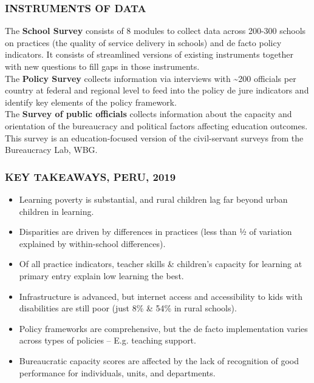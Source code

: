 \documentclass[twocolumn]{article}
\providecommand{\tightlist}{%
  \setlength{\itemsep}{0pt}\setlength{\parskip}{0pt}}
\begin{document}
\hypertarget{instruments-of-data}{%
\subsubsection{\texorpdfstring{\textbf{INSTRUMENTS OF
DATA}}{INSTRUMENTS OF DATA}}\label{instruments-of-data}}

The \textbf{School Survey} consists of 8 modules to collect data across
200-300 schools on practices (the quality of service delivery in
schools) and de facto policy indicators. It consists of streamlined
versions of existing instruments together with new questions to fill
gaps in those instruments.\\
The \textbf{Policy Survey} collects information via interviews with
\textasciitilde{}200 officials per country at federal and regional level
to feed into the policy de jure indicators and identify key elements of
the policy framework.\\
The \textbf{Survey of public officials} collects information about the
capacity and orientation of the bureaucracy and political factors
affecting education outcomes. This survey is an education-focused
version of the civil-servant surveys from the Bureaucracy Lab, WBG.

\hypertarget{key-takeaways-peru-2019}{%
\subsubsection{\texorpdfstring{\textbf{KEY TAKEAWAYS, PERU,
2019}}{KEY TAKEAWAYS, PERU, 2019}}\label{key-takeaways-peru-2019}}

\begin{itemize}
\tightlist
\item
  Learning poverty is substantial, and rural children lag far beyond
  urban children in learning.
\item
  Disparities are driven by differences in practices (less than ½ of
  variation explained by within-school differences).
\item
  Of all practice indicators, teacher skills \& children's capacity for
  learning at primary entry explain low learning the best.
\item
  Infrastructure is advanced, but internet access and accessibility to
  kids with disabilities are still poor (just 8\% \& 54\% in rural
  schools).
\item
  Policy frameworks are comprehensive, but the de facto implementation
  varies across types of policies -- E.g. teaching support.
\item
  Bureaucratic capacity scores are affected by the lack of recognition
  of good performance for individuals, units, and departments.
\end{itemize}
\end{document}
